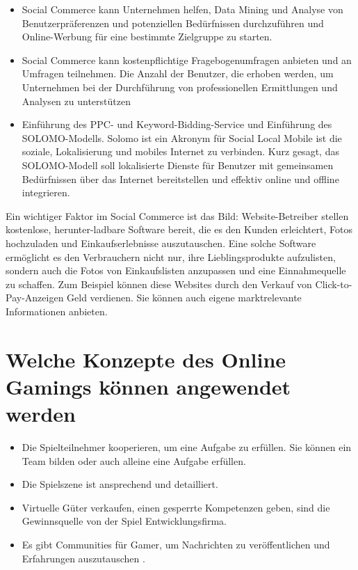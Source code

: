 \begin{itemize}
\begin{itemize}
\item Social Commerce kann Unternehmen helfen, Data Mining und Analyse von Benutzerpräferenzen und potenziellen Bedürfnissen durchzuführen und Online-Werbung für eine bestimmte Zielgruppe zu starten.
\item Social Commerce kann kostenpflichtige Fragebogenumfragen anbieten und an Umfragen teilnehmen. Die Anzahl der Benutzer, die erhoben werden, um Unternehmen bei der Durchführung von professionellen Ermittlungen und Analysen zu unterstützen
\item Einführung des PPC- und Keyword-Bidding-Service und Einführung des SOLOMO-Modells. Solomo ist ein Akronym für Social Local Mobile ist die soziale, Lokalisierung und mobiles Internet zu verbinden. Kurz gesagt, das SOLOMO-Modell soll lokalisierte Dienste für Benutzer mit gemeinsamen Bedürfnissen über das Internet bereitstellen und effektiv online und offline integrieren.
\end{itemize}

\end{itemize}

Ein wichtiger Faktor im Social Commerce ist das Bild: Website-Betreiber stellen kostenlose, herunter-ladbare Software bereit, die es den Kunden erleichtert, Fotos hochzuladen und Einkaufserlebnisse auszutauschen. Eine solche Software ermöglicht es den Verbrauchern nicht nur, ihre Lieblingsprodukte aufzulisten, sondern auch die Fotos von Einkaufslisten anzupassen und eine Einnahmequelle zu schaffen. Zum Beispiel können diese Websites durch den Verkauf von Click-to-Pay-Anzeigen Geld verdienen. Sie können auch eigene marktrelevante Informationen anbieten.


\section{Welche Konzepte des Online Gamings können angewendet werden}

\begin{itemize}
\item Die Spielteilnehmer kooperieren, um eine Aufgabe zu erfüllen. Sie können ein Team bilden oder auch alleine eine Aufgabe erfüllen.
\item Die Spielszene ist ansprechend und detailliert.
\item Virtuelle Güter verkaufen,  einen gesperrte Kompetenzen geben, sind die Gewinnsquelle von der Spiel Entwicklungsfirma.
\item Es gibt Communities für Gamer, um Nachrichten zu veröffentlichen und Erfahrungen auszutauschen \parencite[S. 126]{warmelink}.
\end{itemize}
